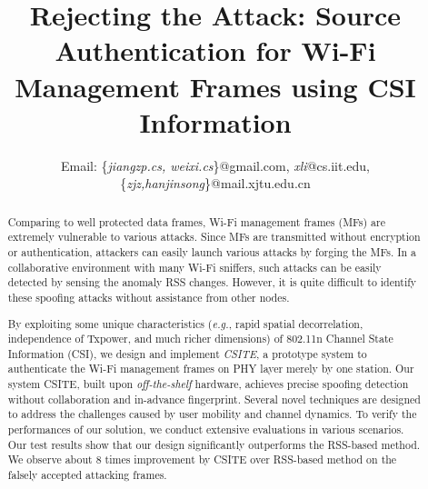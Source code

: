\documentclass[conference]{IEEEtran}
\def\eg{\textit{e.g.}\xspace}
\begin{document}
\title{Rejecting the Attack: Source Authentication for Wi-Fi Management Frames using CSI Information}

\author{
Email: \{\emph{jiangzp.cs, weixi.cs}\}@gmail.com, \emph{xli}@cs.iit.edu, \{\emph{zjz,hanjinsong}\}@mail.xjtu.edu.cn}


\maketitle

\begin{abstract}

Comparing to well protected data frames, Wi-Fi management frames (MFs)
 are extremely vulnerable to various attacks.
Since MFs are transmitted without encryption or authentication,
attackers can easily launch various attacks by forging the MFs.
In a collaborative environment with many Wi-Fi sniffers, such attacks can be easily detected by sensing the anomaly RSS changes.
However, it is quite difficult to identify these spoofing attacks without assistance from other nodes.

By exploiting some unique characteristics (\eg,
 rapid spatial decorrelation, independence  of Txpower, and much
 richer dimensions)  of 802.11n Channel State Information
 (CSI), we design and implement \emph{CSITE}, a prototype system to authenticate the Wi-Fi management frames on PHY layer merely by one station.
Our system CSITE, built upon \textit{off-the-shelf} hardware,
 achieves precise spoofing detection without collaboration and
 in-advance fingerprint.
Several novel techniques are designed to address the challenges
 caused by user mobility and channel dynamics.
To verify the performances of our solution, we conduct extensive evaluations in various
 scenarios.
Our test results show that our design significantly outperforms the
 RSS-based method. We observe about $8$ times improvement by CSITE over RSS-based method
 on the falsely accepted attacking frames.



\end{abstract}
\end{document}

